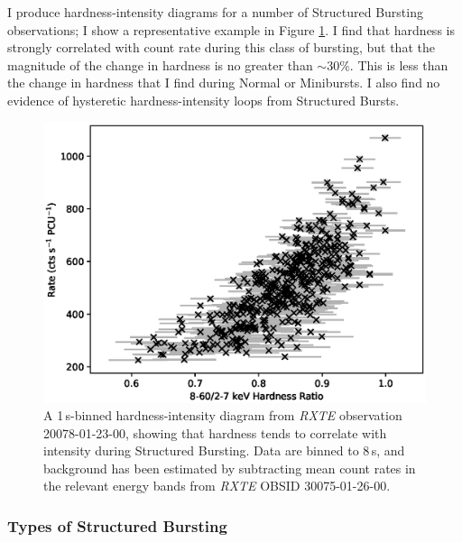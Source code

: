 \par I produce hardness-intensity diagrams for a number of Structured Bursting observations; I show a representative example in Figure \ref{fig:struc_hard}.  I find that hardness is strongly correlated with count rate during this class of bursting, but that the magnitude of the change in hardness is no greater than $\sim30\%$.  This is less than the change in hardness that I find during Normal or Minibursts.  I also find no evidence of hysteretic hardness-intensity loops from Structured Bursts.

\begin{figure}
  \centering
  \includegraphics[width=.9\linewidth, trim={0.4cm 0 1.cm 0},clip]{images/struc_hard.eps}
  \caption[A hardness-intensity diagram from \textit{RXTE} observation 20078-01-23-00, showing that hardness tends to correlate with intensity during Structured Bursting.]{\small A 1\,s-binned hardness-intensity diagram from \indexrxte\textit{RXTE} observation 20078-01-23-00, showing that hardness tends to correlate with intensity during Structured Bursting.  Data are binned to 8\,s, and background has been estimated by subtracting mean count rates in the relevant energy bands from \textit{RXTE} OBSID 30075-01-26-00.}
  \label{fig:struc_hard}
\end{figure}

\subsubsection{Types of Structured Bursting}
\label{sec:struc_var}

